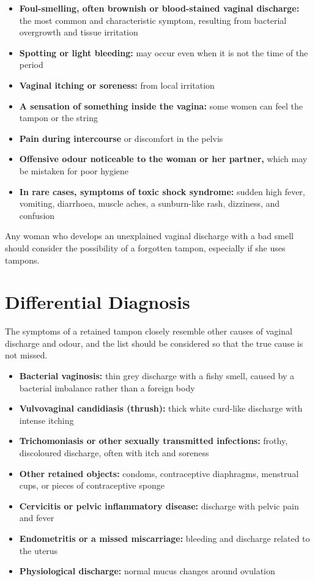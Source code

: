 \begin{itemize}
    \item \textbf{Foul-smelling, often brownish or blood-stained vaginal discharge:} the most common and characteristic symptom, resulting from bacterial overgrowth and tissue irritation
    \item \textbf{Spotting or light bleeding:} may occur even when it is not the time of the period
    \item \textbf{Vaginal itching or soreness:} from local irritation
    \item \textbf{A sensation of something inside the vagina:} some women can feel the tampon or the string
    \item \textbf{Pain during intercourse} or discomfort in the pelvis
    \item \textbf{Offensive odour noticeable to the woman or her partner,} which may be mistaken for poor hygiene
    \item \textbf{In rare cases, symptoms of toxic shock syndrome:} sudden high fever, vomiting, diarrhoea, muscle aches, a sunburn-like rash, dizziness, and confusion
\end{itemize}

Any woman who develops an unexplained vaginal discharge with a bad smell should consider the possibility of a forgotten tampon, especially if she uses tampons.

\section*{Differential Diagnosis}
The symptoms of a retained tampon closely resemble other causes of vaginal discharge and odour, and the list should be considered so that the true cause is not missed.

\begin{itemize}
    \item \textbf{Bacterial vaginosis:} thin grey discharge with a fishy smell, caused by a bacterial imbalance rather than a foreign body
    \item \textbf{Vulvovaginal candidiasis (thrush):} thick white curd-like discharge with intense itching
    \item \textbf{Trichomoniasis or other sexually transmitted infections:} frothy, discoloured discharge, often with itch and soreness
    \item \textbf{Other retained objects:} condoms, contraceptive diaphragms, menstrual cups, or pieces of contraceptive sponge
    \item \textbf{Cervicitis or pelvic inflammatory disease:} discharge with pelvic pain and fever
    \item \textbf{Endometritis or a missed miscarriage:} bleeding and discharge related to the uterus
    \item \textbf{Physiological discharge:} normal mucus changes around ovulation
\end{itemize}

